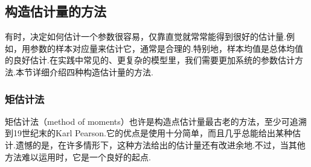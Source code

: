 \subsection{构造估计量的方法}\label{sec:7.2}
有时，决定如何估计一个参数很容易，仅靠直觉就常常能得到很好的估计量.例如，用参数的样本对应量来估计它，通常是合理的.特别地，样本均值是总体均值的良好估计.在实践中常见的、更复杂的模型里，我们需要更加系统的参数估计方法.本节详细介绍四种构造估计量的方法.
\subsubsection{矩估计法}\label{sec:7.2.1}
矩估计法（method of moments）也许是构造点估计量最古老的方法，至少可追溯到19世纪末的Karl Pearson.它的优点是使用十分简单，而且几乎总能给出某种估计.遗憾的是，在许多情形下，这种方法给出的估计量还有改进余地.不过，当其他方法难以运用时，它是一个良好的起点.

